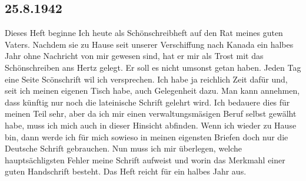 \subsection{25.8.1942}

Dieses Heft beginne Ich heute als Sch\"{o}nschreibheft auf den Rat meines guten Vaters.
Nachdem sie zu Hause seit unserer Verschiffung nach Kanada ein halbes Jahr ohne Nachricht von mir gewesen sind, hat er mir als Trost mit das Sch\"{o}nschreiben ans Hertz gelegt.
Er soll es nicht umsonst getan haben.
Jeden Tag eine Seite Sc\"{o}nschrift wil ich versprechen.
Ich habe ja reichlich Zeit daf\"{u}r und, seit ich meinen eigenen Tisch habe, auch Gelegenheit dazu.
Man kann annehmen, dass k\"{u}nftig nur noch die lateinische Schrift gelehrt wird.
Ich bedauere dies f\"{u}r meinen Teil sehr, aber da ich mir einen verwaltungsm\"{a}sigen Beruf selbst gew\"{a}lht habe, muss ich mich auch in dieser Hinsicht abfinden.
Wenn ich wieder zu Hause bin, dann werde ich f\"{u}r mich sowieso in meinen eigensten Briefen doch nur die Deutsche Schrift gebrauchen.
Nun muss ich mir \"{u}berlegen, welche haupts\"{a}chligsten Fehler meine Schrift aufweist und worin das Merkmahl einer guten Handschrift besteht.
Das Heft reicht f\"{u}r ein halbes Jahr aus.

\clearpage
